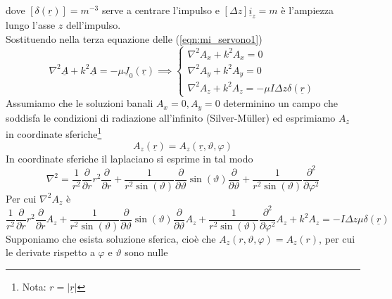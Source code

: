 \documentclass{book}
\begin{document}
            dove $[\delta(\underline{r})] = m^{-3}$ serve a centrare l'impulso e $[\Delta z] \underline{i}_{z}= m$ è l'ampiezza lungo l'asse $z$ dell'impulso. \\
            Sostituendo  nella terza equazione delle (\ref{eqn:mi_servono1})
            \begin{equation}
                \label{eqn:mi_servono2}
                \nabla ^{2} \underline{A}+k^{2}\underline{A} = - \mu \underline{J}_{0}(\underline{r}) \implies
                \begin{cases}
                    \nabla ^{2} A_{x}+k^{2}A_{x} = 0 \\
                    \nabla ^{2} A_{y}+k^{2}A_{y} = 0 \\
                    \nabla ^{2} A_{z}+k^{2}A_{z} = -\mu I \Delta z \delta (\underline{r})
                \end{cases}
            \end{equation}
            Assumiamo che le soluzioni banali $A_{x} = 0, A_{y}=0$ determinino un campo che soddisfa le condizioni di radiazione all'infinito (Silver-M{\"u}ller) ed esprimiamo $A_{z}$ in coordinate sferiche\footnote{Nota: $r = |\underline{r}|$}
            \begin{equation}
                A_{z}(\underline{r}) = A_{z}(\underline{r}, \vartheta, \varphi)
            \end{equation}
            In coordinate sferiche il laplaciano si esprime in tal modo
            \begin{equation}
                \nabla ^{2} = \frac{1}{r^{2}}\frac{\partial}{\partial r} r^{2} \frac{\partial}{\partial r} + \frac{1}{r^{2}\sin(\vartheta)} \frac{\partial}{\partial \vartheta} \sin(\vartheta) \frac{\partial}{\partial \vartheta} +
                \frac{1}{r^{2}\sin(\vartheta)} \frac{\partial ^{2}}{\partial \varphi ^{2}} 
            \end{equation}
            Per cui $\nabla ^{2} A_{z}$ è  
            \begin{equation}
                \frac{1}{r^{2}}\frac{\partial}{\partial r} r^{2} \frac{\partial}{\partial r} A_{z} + \frac{1}{r^{2}\sin(\vartheta)} \frac{\partial}{\partial \vartheta} \sin(\vartheta) \frac{\partial}{\partial \vartheta}A_{z} +
                \frac{1}{r^{2}\sin(\vartheta)} \frac{\partial ^{2}}{\partial \varphi ^{2}} A_{z} + k^{2}A_{z} = -I\Delta z \mu \delta (\underline{r})
            \end{equation}
            Supponiamo che esista soluzione sferica, cioè che $A_{z}(r, \vartheta, \varphi) = A_{z}(r)$, per cui le derivate rispetto a $\varphi$ e $\vartheta$ sono nulle
\end{document}
